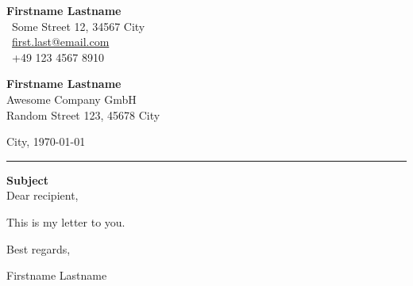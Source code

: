 \documentclass[a4paper,12pt]{article}
\newcommand*{\lettercity}{City}                             %
\newcommand*{\letterdate}{\today}                           %
\begin{document}
\begin{flushright}
    \textbf{Firstname Lastname} \\
    \color{gray}
    ~Some Street 12, 34567 City \\
    ~\href{mailto:first.last@email.com}{first.last@email.com} \\
    ~+49 123 4567 8910
\end{flushright}

\begin{flushleft}
    \textbf{Firstname Lastname} \\
    \color{gray}
    Awesome Company GmbH \\
    Random Street 123, 45678 City
\end{flushleft}

\hfill \lettercity, \letterdate \\[-1.5ex]
\rule{\textwidth}{0.8pt}
\textbf{Subject} \\[2ex]

Dear recipient,
\par
This is my letter to you.
\par
Best regards,
\par
Firstname Lastname



\end{document}
